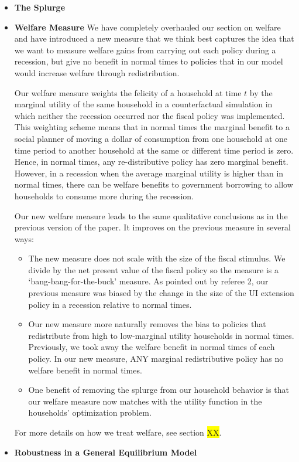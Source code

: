 \begin{itemize}
	\item \textbf{The Splurge}
	\item \textbf{Welfare Measure} We have completely overhauled our section on welfare and have introduced a new measure that we think best captures the idea that we want to measure welfare gains from carrying out each policy during a recession, but give no benefit in normal times to policies that in our model would increase welfare through redistribution. 
	
	Our welfare measure weights the felicity of a household at time $t$ by the marginal utility of the same household in a counterfactual simulation in which neither the recession occurred nor the fiscal policy was implemented. This weighting scheme means that in normal times the marginal benefit to a social planner of moving a dollar of consumption from one household at one time period to another household at the same or different time period is zero. Hence, in normal times, any re-distributive policy has zero marginal benefit. However, in a recession when the average marginal utility is higher than in normal times, there can be welfare benefits to government borrowing to allow households to consume more during the recession.
	
	Our new welfare measure leads to the same qualitative conclusions as in the previous version of the paper. It improves on the previous measure in several ways:
	\begin{itemize}
		\item The new measure does not scale with the size of the fiscal stimulus. We divide by the net present value of the fiscal policy so the measure is a `bang-bang-for-the-buck' measure. As pointed out by referee 2, our previous measure was biased by the change in the size of the UI extension policy in a recession relative to normal times.
		\item Our new measure more naturally removes the bias to policies that redistribute from high to low-marginal utility households in normal times. Previously, we took away the welfare benefit in normal times of each policy. In our new measure, ANY marginal redistributive policy has no welfare benefit in normal times.
		\item One benefit of removing the splurge from our household behavior is that our welfare measure now matches with the utility function in the households' optimization problem.
	\end{itemize}
	For more details on how we treat welfare, see section \colorbox{yellow}{XX}.
	
	\item \textbf{Robustness in a General Equilibrium Model}
\end{itemize}